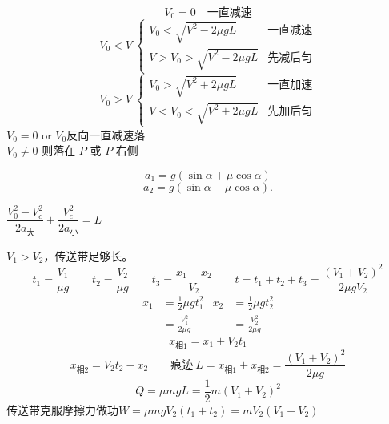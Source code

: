 \[
V_0=0\quad\text{一直减速}
\]
\[
V_0<V\ \left\{\begin{array}{ll}
V_0<\sqrt{V^2-2\mu gL} & \text{一直减速}\\
V>V_0>\sqrt{V^2-2\mu gL} & \text{先减后匀}
\end{array}\right.
\]
\[
V_0>V\ \left\{\begin{array}{ll}
V_0>\sqrt{V^2+2\mu gL} & \text{一直加速}\\
V<V_0<\sqrt{V^2+2\mu gL} & \text{先加后匀}
\end{array}\right.
\]
$V_0=0$ or $V_0$反向\quad 一直减速落\\
$V_0\neq0$ 则\quad 落在 $P$ 或 $P$ 右侧

\[ a_1=g(\sin\alpha+\mu\cos\alpha) \]
\[ a_2=g(\sin\alpha-\mu\cos\alpha). \]


\quad $\dfrac{V_0^2-V_c^2}{2a_{\text{大}}}+\dfrac{V_c^2}{2a_{\text{小}}}=L$%

$V_1>V_2$，传送带足够长。
\[
t_1=\frac{V_1}{\mu g}\qquad t_2=\frac{V_2}{\mu g}\qquad t_3=\frac{x_1-x_2}{V_2}\qquad t=t_1+t_2+t_3=\frac{(V_1+V_2)^2}{2\mu gV_2}
\]
\[
\begin{aligned}
x_1&=\frac12\mu gt_1^2 & x_2&=\frac12\mu gt_2^2\\[2pt]
&=\frac{V_1^2}{2\mu g} & &=\frac{V_2^2}{2\mu g}
\end{aligned}
\]
\[
x_{\text{相}1}=x_1+V_2t_1
\]
\[
x_{\text{相}2}=V_2t_2-x_2\qquad \text{痕迹}\ L=x_{\text{相}1}+x_{\text{相}2}=\frac{(V_1+V_2)^2}{2\mu g}
\]
\[
Q=\mu mgL=\frac12m(V_1+V_2)^2
\]
传送带克服摩擦力做功\quad $W=\mu mgV_2(t_1+t_2)=mV_2(V_1+V_2)$

